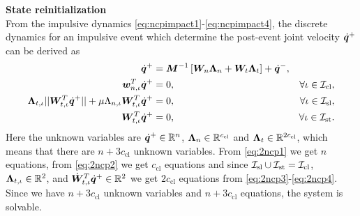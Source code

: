 \documentclass[../DC2019003Bouma.tex]{subfiles}
\begin{document}
\textbf{State reinitialization}\\
From the impulsive dynamics \eqref{eq:ncpimpact1}-\eqref{eq:ncpimpact4}, the discrete dynamics for an impulsive event which determine the post-event joint velocity $\dot{{\boldsymbol{q}}}^+$ can be derived as
\begin{align}
\dot{{\boldsymbol{q}}}^+ &= {\boldsymbol{M}}^{-1}\left[{\boldsymbol{W}}_{n}\boldsymbol{\Lambda}_{n} + {\boldsymbol{W}}_{t}\boldsymbol{\Lambda}_{t}\right] + \dot{{\boldsymbol{q}}}^-, \label{eq:2ncp1}\\
{\boldsymbol{w}}^T_{n,\iota}\dot{{\boldsymbol{q}}}^+ &= 0, &\forall \iota\in\mathcal{I}_{\text{cl}},\label{eq:2ncp2}\\
\boldsymbol{\Lambda}_{t,\iota}||{\boldsymbol{W}}^T_{t,\iota}\dot{{\boldsymbol{q}}}^+|| + \mu\Lambda_{n,\iota}{\boldsymbol{W}}^T_{t,\iota}\dot{{\boldsymbol{q}}}^+&= 0, &\forall \iota\in\mathcal{I}_{\text{sl}},\label{eq:2ncp3}\\
{\boldsymbol{W}}^T_{t,\iota}\dot{{\boldsymbol{q}}}^+ &= 0, &\forall \iota\in\mathcal{I}_{\text{st}}.\label{eq:2ncp4}
\end{align}
Here the unknown variables are $\dot{{\boldsymbol{q}}}^+\in\mathbb{R}^{n}$, $\boldsymbol{\Lambda}_{n}\in\mathbb{R}^{c_{\text{cl}}}$ and $\boldsymbol{\Lambda}_{t}\in\mathbb{R}^{2c_{\text{cl}}}$, which means that there are $n+3c_{\text{cl}}$ unknown variables. From \eqref{eq:2ncp1} we get $n$ equations, from \eqref{eq:2ncp2} we get $c_{\text{cl}}$ equations and since $\mathcal{I}_{\text{sl}}\cup\mathcal{I}_{\text{st}}=\mathcal{I}_{\text{cl}}$, $\boldsymbol{\Lambda}_{t,\iota}\in\mathbb{R}^2$, and $\dot{{\boldsymbol{W}}}^T_{t,\iota}\dot{{\boldsymbol{q}}}^+ \in\mathbb{R}^2$ we get $2c_{\text{cl}}$ equations from \eqref{eq:2ncp3}-\eqref{eq:2ncp4}. Since we have $n+3c_{\text{cl}}$ unknown variables and $n+3c_{\text{cl}}$ equations, the system is solvable.
\end{document}
